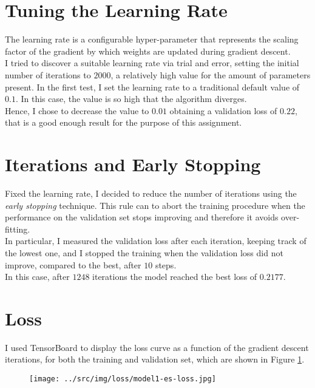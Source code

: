 \documentclass[a4paper,12pt]{article} %
\begin{document}
	\section{Tuning the Learning Rate}
	The learning rate is a configurable hyper-parameter that represents the 
	scaling factor of the gradient by which weights are updated during gradient 
	descent.\\
	I tried to discover a suitable learning rate via trial and error, setting 
	the initial number of iterations to $2000$, a relatively high value for the 
	amount of parameters present.
	In the first test, I set the learning rate to a traditional default value 
	of $0.1$. In this case, the value is so high that the algorithm diverges.\\
	Hence, I chose to decrease the value to $0.01$ obtaining a validation loss 
	of $0.22$, that is a good enough result for the purpose of this assignment.
	
	\section{Iterations and Early Stopping}
	Fixed the learning rate, I decided to reduce the number of iterations using 
	the \textit{early stopping} technique. This rule can to abort the 
	training procedure when the performance on the validation set stops 
	improving and therefore it avoids over-fitting. \\
	In particular, I measured the validation loss after each iteration, keeping 
	track of the lowest one, and I stopped the training when the validation 
	loss did not improve, compared to the best, after $10$ steps.\\
	In this case, after $1248$ iterations the model reached the best loss of 
	$0.2177$.
	
	\section{Loss}
	I used {TensorBoard} to display the loss curve as a function of the 
	gradient 
	descent iterations, for both the training and validation set, which are 
	shown in Figure \ref{fig:model1-loss}.
	
	\begin{figure}[htb]
		\centering
		\texttt{[image: ../src/img/loss/model1-es-loss.jpg]}
		\label{fig:model1-loss}
	\end{figure}
	
\end{document}
